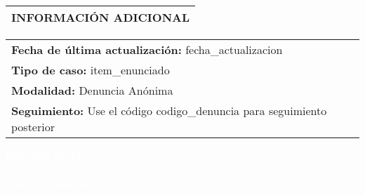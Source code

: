 \documentclass[12pt,a4paper]{article}
\begin{document}
\vspace{0.5cm}

\noindent
\begin{tabularx}{\textwidth}{|>{\columncolor{integraazul}\color{white}\bfseries}X|}
\hline
INFORMACIÓN ADICIONAL \\
\hline
\end{tabularx}

\noindent
\begin{tabularx}{\textwidth}{|X|}
\hline
\textbf{Fecha de última actualización:} {{ fecha_actualizacion }} \\
\textbf{Tipo de caso:} {{ item_enunciado }} \\
\textbf{Modalidad:} Denuncia Anónima \\
\textbf{Seguimiento:} Use el código {{ codigo_denuncia }} para seguimiento posterior \\
\hline
\end{tabularx}

\vspace{0.3cm}

\begin{center}
\colorbox{integraazulclaro}{
    \begin{minipage}{0.9\textwidth}
        \centering
        \textcolor{white}{\textbf{IMPORTANTE:}}\\
        \textcolor{white}{\small Para consultar el estado de su denuncia anónima, conserve este código: \textbf{{{ codigo_denuncia }}}}
    \end{minipage}
}
\end{center}
\end{document}

